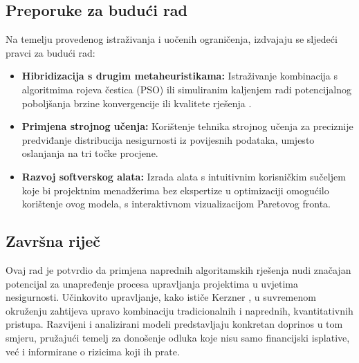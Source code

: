\subsection{Preporuke za budući rad}
Na temelju provedenog istraživanja i uočenih ograničenja, izdvajaju se sljedeći pravci za budući rad:
\begin{itemize}
    \item \textbf{Hibridizacija s drugim metaheuristikama:} Istraživanje kombinacija s algoritmima rojeva čestica (PSO) ili simuliranim kaljenjem radi potencijalnog poboljšanja brzine konvergencije ili kvalitete rješenja \cite{Gandomi2013}.
    \item \textbf{Primjena strojnog učenja:} Korištenje tehnika strojnog učenja za preciznije predviđanje distribucija nesigurnosti iz povijesnih podataka, umjesto oslanjanja na tri točke procjene.
    \item \textbf{Razvoj softverskog alata:} Izrada alata s intuitivnim korisničkim sučeljem koje bi projektnim menadžerima bez ekspertize u optimizaciji omogućilo korištenje ovog modela, s interaktivnom vizualizacijom Paretovog fronta.
\end{itemize}

\subsection{Završna riječ}
Ovaj rad je potvrdio da primjena naprednih algoritamskih rješenja nudi značajan potencijal za unapređenje procesa upravljanja projektima u uvjetima nesigurnosti. Učinkovito upravljanje, kako ističe Kerzner \cite{Kerzner2017}, u suvremenom okruženju zahtijeva upravo kombinaciju tradicionalnih i naprednih, kvantitativnih pristupa. Razvijeni i analizirani modeli predstavljaju konkretan doprinos u tom smjeru, pružajući temelj za donošenje odluka koje nisu samo financijski isplative, već i informirane o rizicima koji ih prate.
